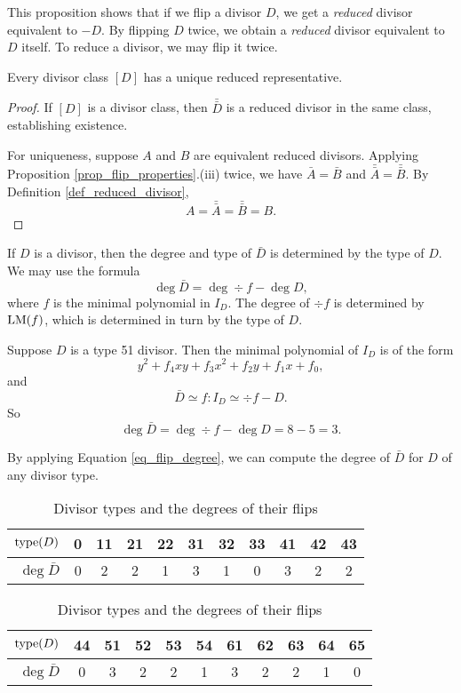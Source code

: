 This proposition shows that if we flip a divisor $D$, we get a \emph{reduced} divisor equivalent to $-D$.
By flipping $D$ twice, we obtain a \emph{reduced} divisor equivalent to $D$ itself.
To reduce a divisor, we may flip it twice.

\begin{theorem}
  Every divisor class $[D]$ has a unique reduced representative.
\end{theorem}
\begin{proof}
  If $[D]$ is a divisor class, then $\bar{\bar D}$ is a reduced divisor in the same class,
  establishing existence.
  
  For uniqueness, suppose $A$ and $B$ are equivalent reduced divisors.
  Applying Proposition \ref{prop_flip_properties}.(iii) twice,
  we have $\bar A = \bar B$ and $\bar{\bar A} = \bar{\bar B}$.
  By Definition \ref{def_reduced_divisor},
    \[ A = \bar{\bar A} = \bar{\bar B} = B. \]
\end{proof}

If $D$ is a divisor, then the degree and type of $\bar D$ is determined by the type of $D$.
We may use the formula
\begin{equation}
  \label{eq_flip_degree}
  \deg \bar D = \deg \div f - \deg D,
\end{equation}
where $f$ is the minimal polynomial in $I_D$. The degree of $\div f$ is determined by $\operatorname{LM}(f)$,
which is determined in turn by the type of $D$.
\begin{example}
  Suppose $D$ is a type 51 divisor.
  Then the minimal polynomial of $I_D$ is of the form
  \[ y^2 + f_4xy + f_3x^2 + f_2y + f_1x + f_0, \]
  and
  \[ \bar D \simeq f : I_D \simeq \div f - D. \]
  So
  \[ \deg \bar D = \deg \div f - \deg D = 8 - 5 = 3. \]
\end{example}

By applying Equation \ref{eq_flip_degree},
we can compute the degree of $\bar D$ for $D$ of any divisor type.
\begin{table}[hb]
\label{tab_flip_degree}
\begin{center}
  \begin{tabular}{r|cccccccccc}
    $\operatorname{type}(D)$    & 0 & 11 & 21 & 22 & 31 & 32 & 33 & 41 & 42 & 43 \\
    \hline
    $\deg \bar D$ & 0 & 2  & 2  & 1  & 3  & 1  & 0  & 3  & 2  & 2
  \end{tabular}
    
  \begin{tabular}{r|cccccccccc}
    $\operatorname{type}(D)$    & 44 & 51 & 52 & 53 & 54 & 61 & 62 & 63 & 64 & 65 \\
    \hline 
    $\deg \bar D$ & 0  & 3  & 2  & 2  & 1  & 3  & 2  & 2  & 1  & 0
  \end{tabular}
\end{center}
\caption{Divisor types and the degrees of their flips}
\end{table}

